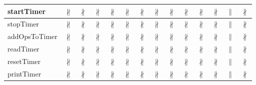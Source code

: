 \documentclass[10pt]{article}
\begin{document}
\begin{longtable}{|l|l|l|l|l|l|l|l|l|l|l|l|l|l|}
\hline
startTimer&{\color{BrickRed}$\nparallel$}&{\color{BrickRed}$\nparallel$}&{\color{BrickRed}$\nparallel$}&{\color{BrickRed}$\nparallel$}&{\color{BrickRed}$\nparallel$}&{\color{BrickRed}$\nparallel$}&{\color{BrickRed}$\nparallel$}&{\color{BrickRed}$\nparallel$}&{\color{BrickRed}$\nparallel$}&{\color{BrickRed}$\nparallel$}&{\color{BrickRed}$\nparallel$}&{\color{blue}$\parallel$}&{\color{BrickRed}$\nparallel$}\\
\hline
stopTimer&{\color{BrickRed}$\nparallel$}&{\color{BrickRed}$\nparallel$}&{\color{BrickRed}$\nparallel$}&{\color{BrickRed}$\nparallel$}&{\color{BrickRed}$\nparallel$}&{\color{BrickRed}$\nparallel$}&{\color{BrickRed}$\nparallel$}&{\color{BrickRed}$\nparallel$}&{\color{BrickRed}$\nparallel$}&{\color{BrickRed}$\nparallel$}&{\color{BrickRed}$\nparallel$}&{\color{blue}$\parallel$}&{\color{BrickRed}$\nparallel$}\\
\hline
addOpsToTimer&{\color{BrickRed}$\nparallel$}&{\color{BrickRed}$\nparallel$}&{\color{BrickRed}$\nparallel$}&{\color{BrickRed}$\nparallel$}&{\color{BrickRed}$\nparallel$}&{\color{BrickRed}$\nparallel$}&{\color{BrickRed}$\nparallel$}&{\color{BrickRed}$\nparallel$}&{\color{BrickRed}$\nparallel$}&{\color{BrickRed}$\nparallel$}&{\color{BrickRed}$\nparallel$}&{\color{blue}$\parallel$}&{\color{BrickRed}$\nparallel$}\\
\hline
readTimer&{\color{BrickRed}$\nparallel$}&{\color{BrickRed}$\nparallel$}&{\color{BrickRed}$\nparallel$}&{\color{BrickRed}$\nparallel$}&{\color{BrickRed}$\nparallel$}&{\color{BrickRed}$\nparallel$}&{\color{BrickRed}$\nparallel$}&{\color{BrickRed}$\nparallel$}&{\color{BrickRed}$\nparallel$}&{\color{BrickRed}$\nparallel$}&{\color{BrickRed}$\nparallel$}&{\color{blue}$\parallel$}&{\color{BrickRed}$\nparallel$}\\
\hline
resetTimer&{\color{BrickRed}$\nparallel$}&{\color{BrickRed}$\nparallel$}&{\color{BrickRed}$\nparallel$}&{\color{BrickRed}$\nparallel$}&{\color{BrickRed}$\nparallel$}&{\color{BrickRed}$\nparallel$}&{\color{BrickRed}$\nparallel$}&{\color{BrickRed}$\nparallel$}&{\color{BrickRed}$\nparallel$}&{\color{BrickRed}$\nparallel$}&{\color{BrickRed}$\nparallel$}&{\color{blue}$\parallel$}&{\color{BrickRed}$\nparallel$}\\
\hline
printTimer&{\color{BrickRed}$\nparallel$}&{\color{BrickRed}$\nparallel$}&{\color{BrickRed}$\nparallel$}&{\color{BrickRed}$\nparallel$}&{\color{BrickRed}$\nparallel$}&{\color{BrickRed}$\nparallel$}&{\color{BrickRed}$\nparallel$}&{\color{BrickRed}$\nparallel$}&{\color{BrickRed}$\nparallel$}&{\color{BrickRed}$\nparallel$}&{\color{BrickRed}$\nparallel$}&{\color{blue}$\parallel$}&{\color{BrickRed}$\nparallel$}\\

\end{longtable}
\end{document}
